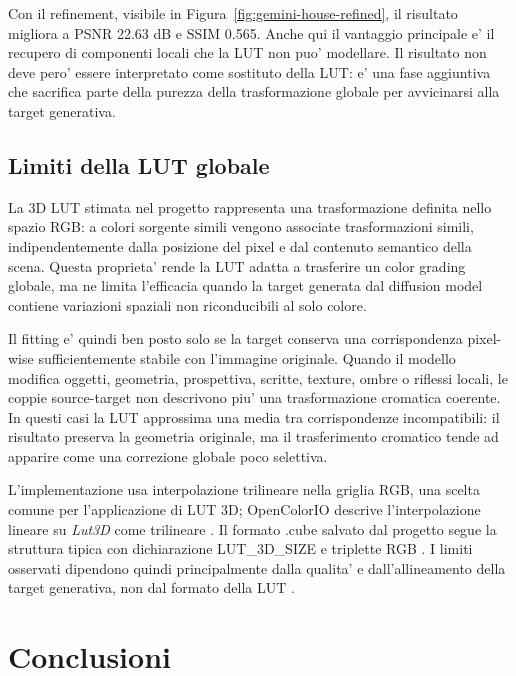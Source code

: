 \documentclass[12pt,a4paper]{report}
\renewcommand{\texttt}[1]{{\normalfont #1}}
\begin{document}
Con il refinement, visibile in Figura~\ref{fig:gemini-house-refined}, il risultato migliora a PSNR 22.63 dB e SSIM 0.565. Anche qui il vantaggio principale e' il recupero di componenti locali che la LUT non puo' modellare. Il risultato non deve pero' essere interpretato come sostituto della LUT: e' una fase aggiuntiva che sacrifica parte della purezza della trasformazione globale per avvicinarsi alla target generativa.




\section{Limiti della LUT globale}

La 3D LUT stimata nel progetto rappresenta una trasformazione definita nello spazio RGB: a colori sorgente simili vengono associate trasformazioni simili, indipendentemente dalla posizione del pixel e dal contenuto semantico della scena. Questa proprieta' rende la LUT adatta a trasferire un color grading globale, ma ne limita l'efficacia quando la target generata dal diffusion model contiene variazioni spaziali non riconducibili al solo colore.

Il fitting e' quindi ben posto solo se la target conserva una corrispondenza pixel-wise sufficientemente stabile con l'immagine originale. Quando il modello modifica oggetti, geometria, prospettiva, scritte, texture, ombre o riflessi locali, le coppie source-target non descrivono piu' una trasformazione cromatica coerente. In questi casi la LUT approssima una media tra corrispondenze incompatibili: il risultato preserva la geometria originale, ma il trasferimento cromatico tende ad apparire come una correzione globale poco selettiva.

L'implementazione usa interpolazione trilineare nella griglia RGB, una scelta comune per l'applicazione di LUT 3D; OpenColorIO descrive l'interpolazione lineare su \textit{Lut3D} come trilineare \cite{opencolorio_interpolation}. Il formato \texttt{.cube} salvato dal progetto segue la struttura tipica con dichiarazione \texttt{LUT\_3D\_SIZE} e triplette RGB \cite{cube_format}. I limiti osservati dipendono quindi principalmente dalla qualita' e dall'allineamento della target generativa, non dal formato della LUT \cite{brooks_instructpix2pix}.

\chapter{Conclusioni}
\end{document}
